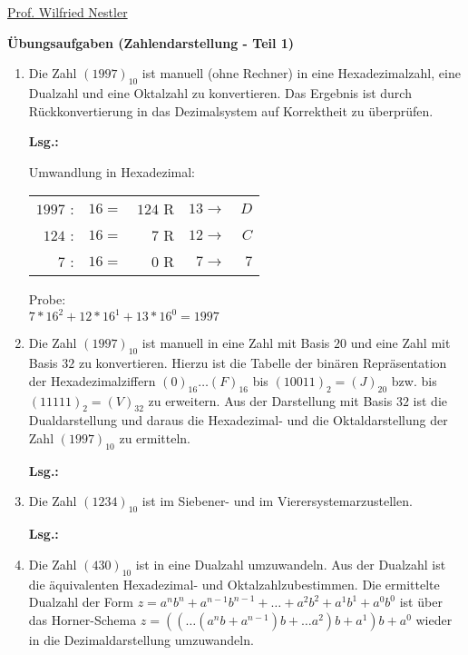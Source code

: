 \documentclass[12pt,a4paper]{scrreprt}
\newcommand{\Lsg}{\par \textbf{Lsg.: }}
\begin{document}
\begin{flushleft}%
\href{mailto:nestler@informatik.htw-dresden.de}{Prof. Wilfried Nestler}
\end{flushleft}

\large\textbf{Übungsaufgaben (Zahlendarstellung - Teil 1)}

\begin{enumerate}

\item Die Zahl $(1997)_{10}$ ist manuell (ohne Rechner) in eine Hexadezimalzahl, eine Dualzahl und eine Oktalzahl zu konvertieren. Das Ergebnis ist durch Rückkonvertierung in das Dezimalsystem auf Korrektheit zu überprüfen.

\Lsg
\par Umwandlung in Hexadezimal: \\
\begin{tabular}{rrrrr}
    $1997$ : & $16 =$ & $124$ R & $13 \rightarrow $ & $D$ \\
    $ 124$ : & $16 =$ & $  7$ R & $12 \rightarrow $ & $C$ \\
    $   7$ : & $16 =$ & $  0$ R & $ 7 \rightarrow $ & $7$
\end{tabular}
\par Probe: \\
\begin{math}
    7*16^2 + 12*16^1 + 13*16^0 = 1997
\end{math}

\item Die Zahl $(1997)_{10}$ ist manuell in eine Zahl mit Basis $20$ und eine Zahl mit Basis $32$ zu konvertieren. Hierzu ist die Tabelle der binären Repräsentation der Hexadezimalziffern $(0)_{16} \ldots (F)_{16}$ bis $(10011)_{2} = (J)_{20}$ bzw. bis $(11111)_{2} = (V)_{32}$ zu erweitern. Aus der Darstellung mit Basis $32$ ist die Dualdarstellung und daraus die Hexadezimal- und die Oktaldarstellung der Zahl $(1997)_{10}$ zu ermitteln.

\Lsg%

\item Die Zahl $(1234)_{10}$ ist im Siebener- und im Vierersystemarzustellen.

\Lsg%

\item Die Zahl $(430)_{10}$ ist in eine Dualzahl umzuwandeln. Aus der Dualzahl ist die äquivalenten Hexadezimal- und Oktalzahlzubestimmen. Die ermittelte Dualzahl der Form $z=a^n b^n +a^{n-1} b^{n - 1} + \ldots + a^2 b^2 + a^1 b^1 + a^0 b^0 $ ist über das Horner-Schema $ z = ((\ldots(a^n b+a^{n-1} )b + \ldots a^2 ) b + a^1 ) b + a^0$ wieder in die Dezimaldarstellung umzuwandeln.


\end{enumerate}
\end{document}
